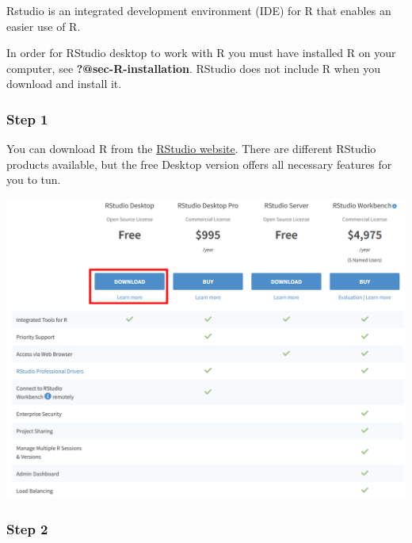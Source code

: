 \documentclass[
  letterpaper,
  DIV=11,
  numbers=noendperiod]{scrreprt}
\begin{document}
Rstudio is an integrated development environment (IDE) for R that
enables an easier use of R.

\begin{tcolorbox}[enhanced jigsaw, leftrule=.75mm, breakable, coltitle=black, opacitybacktitle=0.6, colframe=quarto-callout-important-color-frame, bottomrule=.15mm, toptitle=1mm, left=2mm, opacityback=0, colbacktitle=quarto-callout-important-color!10!white, rightrule=.15mm, bottomtitle=1mm, arc=.35mm, titlerule=0mm, title=\textcolor{quarto-callout-important-color}{\faExclamation}\hspace{0.5em}{Important}, toprule=.15mm, colback=white]
In order for RStudio desktop to work with R you must have installed R on
your computer, see \textbf{?@sec-R-installation}. RStudio does not
include R when you download and install it.
\end{tcolorbox}

\hypertarget{step-1-1}{%
\subsubsection{Step 1}\label{step-1-1}}

You can download R from the
\href{https://www.rstudio.com/products/rstudio/download/}{RStudio
website}. There are different RStudio products available, but the free
Desktop version offers all necessary features for you to tun.

\includegraphics{./images/paste-3C3D0718.png}

\hypertarget{step-2-1}{%
\subsubsection{Step 2}\label{step-2-1}}
\end{document}

